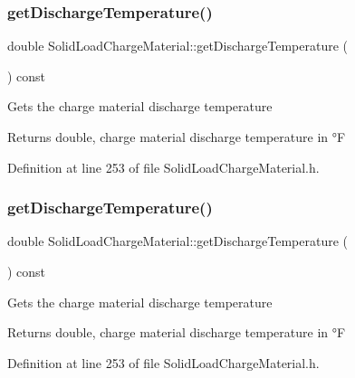 \subsubsection{\texorpdfstring{get\+Discharge\+Temperature()}{getDischargeTemperature()}\hspace{0.1cm}{\footnotesize\ttfamily [1/3]}}
{\footnotesize\ttfamily double Solid\+Load\+Charge\+Material\+::get\+Discharge\+Temperature (\begin{DoxyParamCaption}{ }\end{DoxyParamCaption}) const\hspace{0.3cm}{\ttfamily [inline]}}

Gets the charge material discharge temperature \begin{DoxyReturn}{Returns}
double, charge material discharge temperature in °F 
\end{DoxyReturn}


Definition at line 253 of file Solid\+Load\+Charge\+Material.\+h.

\mbox{\label{class_solid_load_charge_material_afcb8c00c2e23ad1444f34960b19835a0}} 
\subsubsection{\texorpdfstring{get\+Discharge\+Temperature()}{getDischargeTemperature()}\hspace{0.1cm}{\footnotesize\ttfamily [2/3]}}
{\footnotesize\ttfamily double Solid\+Load\+Charge\+Material\+::get\+Discharge\+Temperature (\begin{DoxyParamCaption}{ }\end{DoxyParamCaption}) const\hspace{0.3cm}{\ttfamily [inline]}}

Gets the charge material discharge temperature \begin{DoxyReturn}{Returns}
double, charge material discharge temperature in °F 
\end{DoxyReturn}


Definition at line 253 of file Solid\+Load\+Charge\+Material.\+h.

\mbox{\label{class_solid_load_charge_material_afcb8c00c2e23ad1444f34960b19835a0}} 
